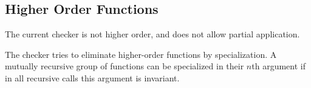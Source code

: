 \documentclass[book]{tfp05symp}
\newcommand{\T}[1]{\texttt{#1}}
\newcommand{\gap}{\;\;}
\begin{document}
\begin{comment}
\subsection{Values}

The values in this reduced language consist only of algebraic data
types, and functions. A value is either a function, or a constructor
and a list of component values. The type of a value can be deduced
statically -- whether it is a function or an algebraic value, and in
the second case, what are its possible constructors.

\subsection{Expressions}

Expressions in reduced Haskell are defined in Figure \ref{fig:ast}.
A convertor from a subset of Haskell to this reduced language has
been written, and all examples from here onwards use this convertor.

\begin{figure}
\begin{tabular}{lcll}
$E$ & ::= & \T{arg} $m$ (written \T{@}$m$)& $|$ \T{sel} $E \gap C \gap m$ (written $E$.$C_m$) \\
    & $|$ & \T{make} $C \gap E_1\cdots E_n$ & $|$ \T{func} $f$ \\
    & $|$ & \T{apply} $E_0 \gap E_1\cdots E_n$ & $|$ \T{case} $E_0$ \T{of} \{$C_1$ \T{->} $E_1$\T{;}
    $\cdots$ \T{;} $C_n$ \T{->} $E_n$\}
\end{tabular} \\
$f$ is the name of a function, $C$ is the name of a constructor, $m$ is a positive integer
\caption{Abstract Syntax of expressions in reduced Haskell} %
\label{fig:ast}
\end{figure}
\end{comment}

\subsection{Higher Order Functions}

The current checker is not higher order, and does not allow partial
application.

The checker tries to eliminate higher-order functions by
specialization. A mutually recursive group of functions can be
specialized in their $n$th argument if in all recursive calls this
argument is invariant.
\end{document}
